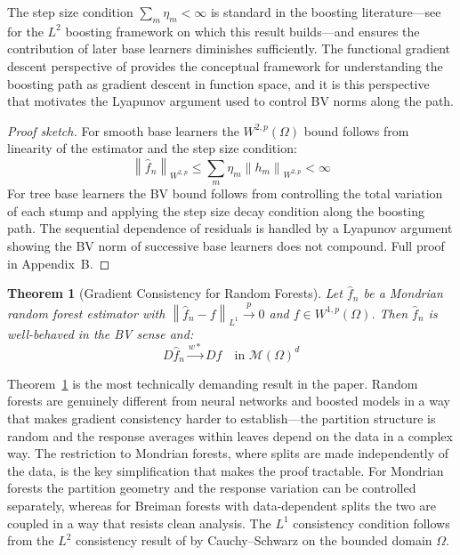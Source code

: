 \documentclass[12pt]{article}
\newtheorem{theorem}{Theorem}
\newcommand{\norm}[1]{\left\| #1 \right\|}
\newcommand{\Wonep}{W^{1,p}(\Omega)}
\newcommand{\Wtwop}{W^{2,p}(\Omega)}
\newcommand{\cM}{\mathcal{M}(\Omega)^d}
\newcommand{\fn}{\hat{f}_n}
\newcommand{\xrightarrowp}{\xrightarrow{p}}
\newcommand{\wstar}{\xrightarrow{w*}}
\begin{document}
	The step size condition $\sum_m \eta_m < \infty$ is standard in the boosting literature---see \citet{buhlmann2003boosting} for the $L^2$ boosting framework on which this result builds---and ensures the contribution of later base learners diminishes sufficiently. The functional gradient descent perspective of \citet{mason2000boosting} provides the conceptual framework for understanding the boosting path as gradient descent in function space, and it is this perspective that motivates the Lyapunov argument used to control BV norms along the path.
	
	\begin{proof}[Proof sketch]
		For smooth base learners the $\Wtwop$ bound follows from linearity of the estimator
		and the step size condition:
		\begin{equation}
			\norm{\fn}_{W^{2,p}} \leq \sum_m \eta_m \norm{h_m}_{W^{2,p}} < \infty
		\end{equation}
		For tree base learners the BV bound follows from controlling the total variation of
		each stump and applying the step size decay condition along the boosting path. The
		sequential dependence of residuals is handled by a Lyapunov argument showing the BV
		norm of successive base learners does not compound. Full proof in Appendix~B.
	\end{proof}
	
	\begin{theorem}[Gradient Consistency for Random Forests]
		\label{thm:forests}
		Let $\fn$ be a Mondrian random forest estimator with
		$\norm{\fn - f}_{L^1} \xrightarrowp 0$ and $f \in \Wonep$. Then $\fn$ is
		well-behaved in the BV sense and:
		\begin{equation}
			D\fn \wstar Df \quad \text{in } \cM
		\end{equation}
	\end{theorem}
	
	Theorem~\ref{thm:forests} is the most technically demanding result in the paper. Random forests are genuinely different from neural networks and boosted models in a way that makes gradient consistency harder to establish---the partition structure is random and the response averages within leaves depend on the data in a complex way. The restriction to Mondrian forests, where splits are made independently of the data, is the key simplification that makes the proof tractable. For Mondrian forests the partition geometry and the response variation can be controlled separately, whereas for Breiman forests with data-dependent splits the two are coupled in a way that resists clean analysis. The $L^1$ consistency condition follows from the $L^2$ consistency result of \citet{scornet2015forests} by Cauchy--Schwarz on the bounded domain $\Omega$.
	
\end{document}
